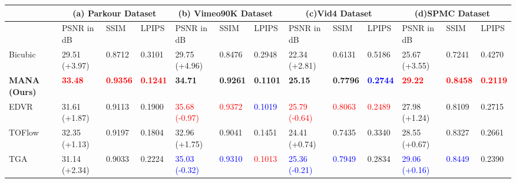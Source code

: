 \begin{table*}[t]
\footnotesize
\begin{tabular}{p{}||p{}<{\centering}|p{}<{\centering}|p{}<{\centering}||p{}<{\centering}|p{}<{\centering}|p{}<{\centering}||p{}<{\centering}|p{}<{\centering}|p{}<{\centering}||p{}<{\centering}|p{}<{\centering}|p{}<{\centering}}
            & \multicolumn{3}{c||}{(a) Parkour Dataset} & \multicolumn{3}{c||}{(b) Vimeo90K Dataset~\cite{vimeo90k}}    & \multicolumn{3}{c||}{(c)Vid4 Dataset~\cite{frvsr}} 
            & \multicolumn{3}{c}{(d)SPMC Dataset~\cite{spmc}} \\ \hline
            & PSNR in dB          & SSIM   &LPIPS         & PSNR in dB & SSIM &LPIPS  & PSNR in dB & SSIM &LPIPS  & PSNR in dB & SSIM   &LPIPS                  \\ \hline
Bicubic     & 29.51 (+3.97)              & 0.8712    &0.3101      & 29.75 (+4.96)    & 0.8476 & 0.2948 & 22.34 (+2.81)     & 0.6131   &0.5186  &25.67 (+3.55) &0.7241 &0.4270                 \\ \hline
\textbf{MANA (Ours)} & \textbf{\textcolor{red}{33.48}}              & \textbf{\textcolor{red}{0.9356}}   &\textbf{\textcolor{red}{0.1241}}       & \textbf{34.71}     & \textbf{0.9261} &\textbf{0.1101} & \textbf{25.15}     & \textbf{0.7796}    &\textbf{\textcolor{blue}{0.2744}}       &\textbf{\textcolor{red}{29.22}} &\textbf{\textcolor{red}{0.8458}} &\textbf{\textcolor{red}{0.2119}}           \\ \hline
EDVR~\cite{edvr}        & 31.61 (+1.87)              & 0.9113    &0.1900      & \textcolor{red}{35.68 (-0.97)}      & \textcolor{red}{0.9372} &\textcolor{blue}{0.1019} & \textcolor{red}{25.79 (-0.64)}     & \textcolor{red}{0.8063}    &\textcolor{red}{0.2489}      &27.98 (+1.24) &0.8109 &0.2715            \\ \hline
TOFlow~\cite{vimeo90k}      & 32.35 (+1.13)             & 0.9197     &0.1804     & 32.96 (+1.75)     & 0.9041 &0.1451 & 24.41 (+0.74)    & 0.7435   &0.3340      &28.55 (+0.67) &0.8327 &0.2661             \\ \hline
TGA~\cite{tga}         & 31.14 (+2.34)             & 0.9033    &0.2224      & \textcolor{blue}{35.03 (-0.32)}      & \textcolor{blue}{0.9310} &\textcolor{red}{0.1013}  & \textcolor{blue}{25.36 (-0.21)}     & \textcolor{blue}{0.7949}   &0.2834      &\textcolor{blue}{29.06 (+0.16)} &\textcolor{blue}{0.8449} &0.2390             \\ \hline

\end{tabular}
\end{table*}
